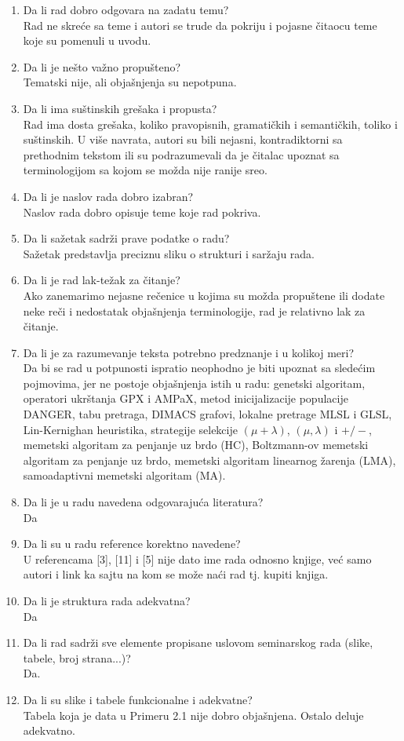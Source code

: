 \documentclass[a4paper]{report}
\begin{document}
\begin{enumerate}
\item Da li rad dobro odgovara na zadatu temu?\\
Rad ne skreće sa teme i autori se trude da pokriju i pojasne čitaocu teme koje su pomenuli u uvodu. 
\item Da li je nešto važno propušteno?\\
Tematski nije, ali objašnjenja su nepotpuna. 
\item Da li ima suštinskih grešaka i propusta?\\
Rad ima dosta grešaka, koliko pravopisnih, gramatičkih i semantičkih, toliko i suštinskih. U više navrata, autori su bili nejasni, kontradiktorni sa prethodnim tekstom ili su podrazumevali da je čitalac upoznat sa terminologijom sa kojom se možda nije ranije sreo.
\item Da li je naslov rada dobro izabran?\\
Naslov rada dobro opisuje teme koje rad pokriva.
\item Da li sažetak sadrži prave podatke o radu?\\
Sažetak predstavlja preciznu sliku o strukturi i saržaju rada.
\item Da li je rad lak-težak za čitanje?\\
Ako zanemarimo nejasne rečenice u kojima su možda propuštene ili dodate neke reči i nedostatak objašnjenja terminologije, rad je relativno lak za čitanje.
\item Da li je za razumevanje teksta potrebno predznanje i u kolikoj meri?\\
Da bi se rad u potpunosti ispratio neophodno je biti upoznat sa sledećim pojmovima, jer ne postoje objašnjenja istih u radu: genetski algoritam, operatori ukrštanja GPX i AMPaX, metod inicijalizacije populacije DANGER, tabu pretraga, DIMACS grafovi, lokalne pretrage MLSL i GLSL, Lin-Kernighan heuristika, strategije selekcije $(\mu + \lambda)$,  $(\mu, \lambda)$ i $+/-$, memetski algoritam za penjanje uz brdo (HC), Boltzmann-ov memetski algoritam za penjanje uz brdo, memetski algoritam linearnog žarenja (LMA), samoadaptivni memetski algoritam (MA).
\item Da li je u radu navedena odgovarajuća literatura?\\
Da
\item Da li su u radu reference korektno navedene?\\
U referencama [3], [11] i [5] nije dato ime rada odnosno knjige, već samo autori i link ka sajtu na kom se može naći rad tj. kupiti knjiga.
\item Da li je struktura rada adekvatna?\\
Da
\item Da li rad sadrži sve elemente propisane uslovom seminarskog rada (slike, tabele, broj strana...)?\\
Da.
\item Da li su slike i tabele funkcionalne i adekvatne?\\
Tabela koja je data u Primeru 2.1 nije dobro objašnjena. Ostalo deluje adekvatno.
\end{enumerate}
\end{document}
